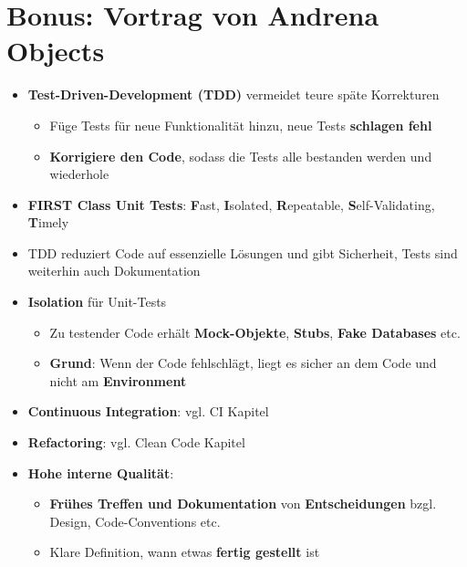 \section{Bonus: Vortrag von Andrena Objects}
\label{bn:sec:bonus_vortrag_von_andrena_objects}

\begin{itemize}
	\item \textbf{Test-Driven-Development (TDD)} vermeidet teure späte Korrekturen
	\begin{itemize}
		\item Füge Tests für neue Funktionalität hinzu, neue Tests \textbf{schlagen fehl}
		\item \textbf{Korrigiere den Code}, sodass die Tests alle bestanden werden und wiederhole
	\end{itemize}
	\item \textbf{FIRST Class Unit Tests}: \textbf{F}ast, \textbf{I}solated, \textbf{R}epeatable, \textbf{S}elf-Validating, \textbf{T}imely
	\item TDD reduziert Code auf essenzielle Lösungen und gibt Sicherheit, Tests sind weiterhin auch Dokumentation
	\item \textbf{Isolation} für Unit-Tests
	\begin{itemize}
		\item Zu testender Code erhält \textbf{Mock-Objekte}, \textbf{Stubs}, \textbf{Fake Databases} etc.
		\item \textbf{Grund}: Wenn der Code fehlschlägt, liegt es sicher an dem Code und nicht am \textbf{Environment}
	\end{itemize}
	\item \textbf{Continuous Integration}: vgl. CI Kapitel
	\item \textbf{Refactoring}: vgl. Clean Code Kapitel
	\item \textbf{Hohe interne Qualität}:
	\begin{itemize}
		\item \textbf{Frühes Treffen und Dokumentation} von \textbf{Entscheidungen} bzgl. Design, Code-Conventions etc.
		\item Klare Definition, wann etwas \textbf{fertig gestellt} ist
	\end{itemize}
\end{itemize}